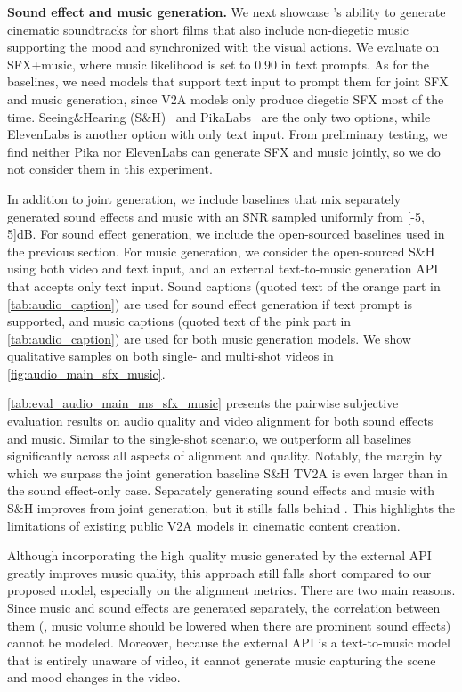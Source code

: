 \noindent\textbf{Sound effect and music generation.}
We next showcase \OursAudio's ability to generate cinematic soundtracks for short films that also include non-diegetic music supporting the mood and synchronized with the visual actions. We evaluate \OursAudio on \OursAudioBenchMGen SFX+music, where music likelihood is set to 0.90 in text prompts.
As for the baselines, we need models that support text input to prompt them for joint SFX and music generation, since V2A models only produce diegetic SFX most of the time.
Seeing\&Hearing (S\&H)~\citep{xing2024seeing} and PikaLabs~\citep{pikalabs} are the only two options, while ElevenLabs is another option with only text input. From preliminary testing, we find neither Pika nor ElevenLabs can generate SFX and music jointly, so we do not consider them in this experiment.





In addition to joint generation, we include baselines that mix separately generated sound effects and music with an SNR sampled uniformly from [-5, 5]dB.
For sound effect generation, we include the open-sourced baselines used in the previous section.
For music generation, we consider the open-sourced S\&H using both video and text input, and an external text-to-music generation API that accepts only text input.
Sound captions (quoted text of the orange part in \cref{tab:audio_caption}) are used for sound effect generation if text prompt is supported, and music captions (quoted text of the pink part in \cref{tab:audio_caption}) are used for both music generation models.
We show qualitative samples on both single- and multi-shot videos in \cref{fig:audio_main_sfx_music}.


\cref{tab:eval_audio_main_ms_sfx_music} presents the pairwise subjective evaluation results on audio quality and video alignment for both sound effects and music.
Similar to the single-shot scenario, we outperform all baselines significantly across all aspects of alignment and quality.
Notably, the margin by which we surpass the joint generation baseline S\&H TV2A is even larger than in the sound effect-only case.
Separately generating sound effects and music with S\&H improves from joint generation, but it stills falls behind \OursAudio.
This highlights the limitations of existing public V2A models in cinematic content creation.


Although incorporating the high quality music generated by the external API greatly improves music quality,
this approach still falls short compared to our proposed model, especially on the alignment metrics.
There are two main reasons.
Since music and sound effects are generated separately, the correlation between them (\eg, music volume should be lowered when there are prominent sound effects) cannot be modeled.
Moreover, because the external API is a text-to-music model that is entirely unaware of video, it cannot generate music capturing the scene and mood changes in the video.



